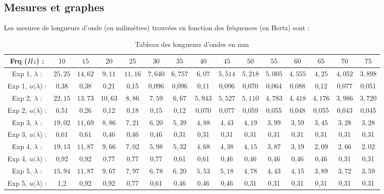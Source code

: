 \documentclass{report}
\begin{document}
\subsection{Mesures et graphes}

Les mesures de longueurs d'onde (en milimètres) trouvées en fonction des fréquences (en Hertz) sont :

\begin{table}[H]
\centering
\caption{Tableau des longueurs d'ondes en mm}
\label{tab:freq}
\scriptsize{\begin{tabular}{c|c|c|c|c|c|c|c|c|c|c|c|c|c|c}
    Frq ($Hz$) : &  $10$ & $15$ & $20$ & $25$ & $30$ & $35$ & $40$ & $45$ & $50$ & $55$ & $60$ & $65$ & $70$ & $75$ \\
    \hline
    Exp 1, $\lambda$ : & $25,25$ & $14,62$ & $9,11$ & $11,16$ & $7,640$ & $6,757$ & $6,07$ & $5,514$ & $5,218$ & $5,005$ & $4,555$ & $4,25$ & $4,052$ & $3,898$ \\
    Exp 1, $u(\lambda$) : & 0,38 & 0,38 & 0,21 & 0,15 & 0,096 & 0,096 & 0,11 & 0,096 & 0,070 & 0,064 &  0,088 & 0,12 & 0,077 & 0,051 \\
    Exp 2, $\lambda$ :  & $22,15$ & $13,73$ & $10,63$ & $8,86$ & $7,59$ & $6,67$ & $5,943$ & $5,527$ & $5,110$ & $4,783$ & $4,418$ & $4,176$ & $3,986$ & $3,720$ \\
    Exp 2, $u(\lambda$) : & 0,51 & 0,26 & 0,12 & 0,18 & 0,15 & 0,12 & 0,070 & 0,077 & 0,059 & 0,055 & 0,048 & 0,055 & 0,043 & 0,045 \\
    Exp 3, $\lambda$ :  & $19,02$ & $11,69$ & $8,86$ & $7,21$ & $6,20$ & $5,39$ & $4,88$ & $4,43$ & $4,19$ & $3,99$ & $3,59$ & $3,45$ & $3,28$ & $3,28$ \\ 
    Exp 3, $u(\lambda$) : & 0,61 & 0,61 & 0,46 & 0,46 & 0,46 & 0,31 & 0,31 & 0,31 & 0,31 & 0,31 & 0,31 & 0,31 & 0,31 & 0,31 \\
    Exp 4, $\lambda$ :  & $19,13$ & $11,87$ & $9,66$ & $7,02$ & $5,98$ & $5,32$ & $4,68$ & $4,38$ & $4,15$ & $3,87$ & $3,19$ & $2,09$ & $2,66$ & $2,02$ \\
    Exp 4, $u(\lambda$) : & 0,92 & 0,92 & 0,77 & 0,77 & 0,77 & 0,61 & 0,61 & 0,46 & 0,46 & 0,46 & 0,46 & 0,46 & 0,31 & 0,31 \\
    Exp 5, $\lambda$ :  & $15,94$ & $11,87$ & $9,67$ & $7,97$ & $6,78$ & $6,20$ & $5,53$ & $5,18$ & $4,78$ & $4,43$ & $4,15$ & $3,89$ & $3,72$ & $3,59$ \\
    Exp 5, $u(\lambda$) : & 1,2 & 0,92 & 0,92 & 0,77 & 0,61 & 0,46 & 0,46 & 0,46 & 0,31 & 0,31 & 0,31 & 0,31 & 0,31 & 0,31 \\
\end{tabular}}
\end{table}
\end{document}
